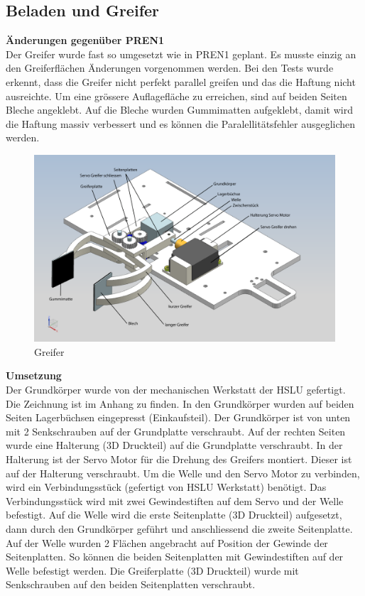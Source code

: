 \newpage
\subsection{Beladen und Greifer}
\textbf{Änderungen gegenüber PREN1}\\[0.2cm]
Der Greifer wurde fast so umgesetzt wie in PREN1 geplant. Es musste einzig an den Greiferflächen Änderungen vorgenommen werden. Bei den Tests wurde erkennt, dass die Greifer nicht perfekt parallel greifen und das die Haftung nicht ausreichte. Um eine grössere Auflagefläche zu erreichen, sind auf beiden Seiten Bleche angeklebt. Auf die Bleche wurden Gummimatten aufgeklebt, damit wird die Haftung massiv verbessert und es können die Paralellitätsfehler ausgeglichen werden.\\[0.2cm]
\begin{figure}[H]
\centering
\includegraphics[width=1\textwidth]{03_Loesungskonzept/pictures/greifer1.png}
\caption{Greifer}
\end{figure}
\textbf{Umsetzung}\\[0.2cm]
Der Grundkörper wurde von der mechanischen Werkstatt der HSLU gefertigt. Die Zeichnung ist im Anhang zu finden. In den Grundkörper wurden auf beiden Seiten Lagerbüchsen eingepresst (Einkaufsteil). Der Grundkörper ist von unten mit 2 Senkschrauben auf der Grundplatte verschraubt.
Auf der rechten Seiten wurde eine Halterung (3D Druckteil) auf die Grundplatte verschraubt. In der Halterung ist der Servo Motor für die Drehung des Greifers montiert. Dieser ist auf der Halterung verschraubt. Um die Welle und den Servo Motor zu verbinden, wird ein Verbindungsstück (gefertigt von HSLU Werkstatt) benötigt. Das Verbindungsstück wird mit zwei Gewindestiften auf dem Servo und der Welle befestigt. Auf die Welle wird die erste Seitenplatte (3D Druckteil) aufgesetzt, dann durch den Grundkörper geführt und anschliessend die zweite Seitenplatte. Auf der Welle wurden 2 Flächen angebracht auf Position der Gewinde der Seitenplatten. So können die beiden Seitenplatten mit Gewindestiften auf der Welle befestigt werden. Die Greiferplatte (3D Druckteil) wurde mit Senkschrauben auf den beiden Seitenplatten verschraubt. 
